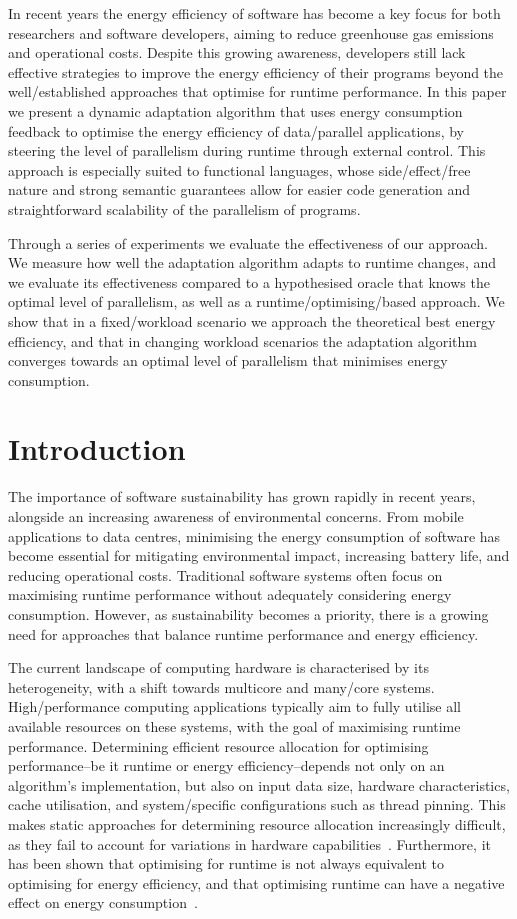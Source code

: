 In recent years the energy efficiency of software has become a key focus for both researchers and software developers, aiming to reduce greenhouse gas emissions and operational costs.
Despite this growing awareness, developers still lack effective strategies to improve the energy efficiency of their programs beyond the well\-/established approaches that optimise for runtime performance.
In this paper we present a dynamic adaptation algorithm that uses energy consumption feedback to optimise the energy efficiency of data\-/parallel applications, by steering the level of parallelism during runtime through external control.
This approach is especially suited to functional languages, whose side\-/effect\-/free nature and strong semantic guarantees allow for easier code generation and straightforward scalability of the parallelism of programs.

Through a series of experiments we evaluate the effectiveness of our approach.
We measure how well the adaptation algorithm adapts to runtime changes, and we evaluate its effectiveness compared to a hypothesised oracle that knows the optimal level of parallelism, as well as a runtime\-/optimising\-/based approach.
We show that in a fixed\-/workload scenario we approach the theoretical best energy efficiency, and that in changing workload scenarios the adaptation algorithm converges towards an optimal level of parallelism that minimises energy consumption.

\section{Introduction}
The importance of software sustainability has grown rapidly in recent years, alongside an increasing awareness of environmental concerns.
From mobile applications to data centres, minimising the energy consumption of software has become essential for mitigating environmental impact, increasing battery life, and reducing operational costs.
Traditional software systems often focus on maximising runtime performance without adequately considering energy consumption.
However, as sustainability becomes a priority, there is a growing need for approaches that balance runtime performance and energy efficiency.

The current landscape of computing hardware is characterised by its heterogeneity, with a shift towards multicore and many\-/core systems.
High\-/performance computing applications typically aim to fully utilise all available resources on these systems, with the goal of maximising runtime performance.
Determining efficient resource allocation for optimising performance\---be it runtime or energy efficiency\---depends not only on an algorithm's implementation, but also on input data size, hardware characteristics, cache utilisation, and system\-/specific configurations such as thread pinning.
This makes static approaches for determining resource allocation increasingly difficult, as they fail to account for variations in hardware capabilities~\cite{buchty2022survey}.
Furthermore, it has been shown that optimising for runtime is not always equivalent to optimising for energy efficiency, and that optimising runtime can have a negative effect on energy consumption~\cite{bangash2022black,pallister2016exploring}.

